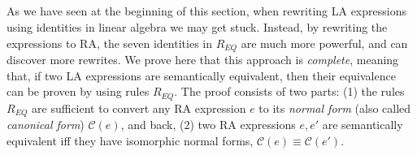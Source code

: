 

\subsection{}\label{ranf}

As we have seen at the beginning of this section, when rewriting LA
expressions using identities in linear algebra we may get stuck. Instead, by
rewriting the expressions to RA, the seven identities in $R_{EQ}$ are
much more powerful, and can discover more rewrites.
We prove
here that this approach is {\em complete}, meaning that, if two LA
expressions are semantically equivalent, then their equivalence can be
proven by using rules $R_{EQ}$.  The proof consists of two parts: (1)
the rules $R_{EQ}$ are sufficient to convert any RA expression $e$ to
its {\em normal form} (also called {\em canonical form})
$\mathcal{C}(e)$, and back, (2) two RA expressions $e, e'$ are
semantically equivalent iff they have isomorphic normal forms,
$\mathcal{C}(e) \equiv \mathcal{C}(e')$.
% 
% 
% 
% 

